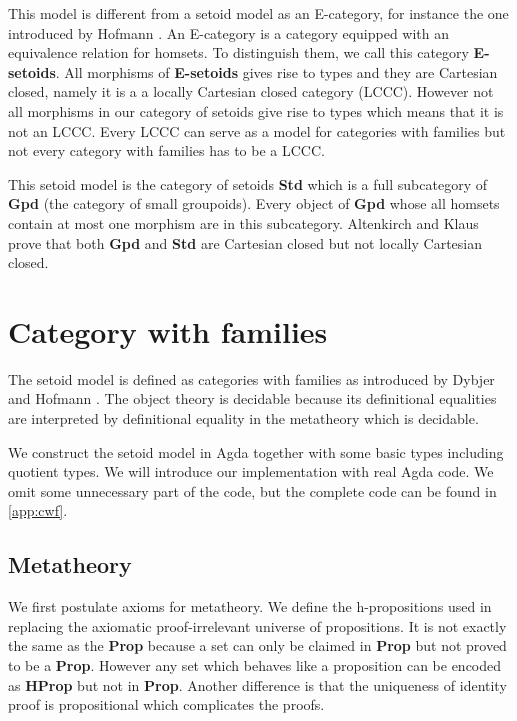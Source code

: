\begin{remark}
This model is different from a setoid model as an E-category, for instance
the one introduced by Hofmann \cite{hofmann1995interpretation}. An E-category is a category equipped with
an equivalence relation for homsets. To distinguish them, we call this
category \textbf{E-setoids}.  All morphisms of \textbf{E-setoids}
gives rise to types and they are Cartesian closed, namely it is a a locally
Cartesian closed category (LCCC). However not all morphisms in our category of setoids give rise to types which means that it is not an LCCC. Every LCCC can serve as a model for categories with
families but not every category with families has to be a LCCC. 

This setoid model is the category of setoids \textbf{Std} which is a full subcategory of \textbf{Gpd} (the category of small groupoids). Every object of \textbf{Gpd} whose all homsets contain at most one morphism are in this subcategory. Altenkirch and Klaus \cite{Altenkirch12setoidsare} prove that both \textbf{Gpd} and \textbf{Std} are Cartesian closed but not locally Cartesian closed.
\end{remark}


\section{Category with families}


The setoid model is defined as categories with families as introduced by Dybjer \cite{Dyb:96} and Hofmann
\cite{hof:97}. The object theory is decidable because its definitional equalities are interpreted by definitional equality in the metatheory which is decidable.

We construct the setoid model in Agda together with some basic types including quotient types. We will introduce our implementation with real Agda code. We omit some unnecessary part of the code, but the complete code can be found in \autoref{app:cwf}.


\subsection{Metatheory}

We first postulate axioms for metatheory. We define the h-propositions used in \hott replacing the axiomatic proof-irrelevant universe of propositions. It is not exactly the same as the \textbf{Prop} because a set can only be claimed in \textbf{Prop} but not proved to be a \textbf{Prop}. However any set which behaves like a proposition can be encoded as \textbf{HProp} but not in \textbf{Prop}. Another difference is that the uniqueness of identity proof is propositional which complicates the proofs.

